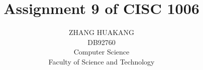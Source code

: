 \documentclass{article}
\title{Assignment 9 of CISC 1006}
\author{ZHANG HUAKANG \\ DB92760 \\Computer Science \\Faculty of Science and Technology}
\begin{document}
    \maketitle
    \section{} 
\end{document}
